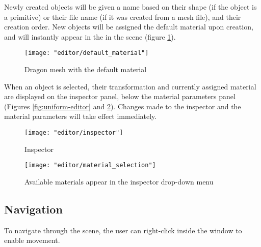 Newly created objects will be given a name based on their shape (if the object is a primitive) or their file name (if it was created from a mesh file), and their creation order. New objects will be assigned the default material upon creation, and will instantly appear in the in the scene (figure \ref{fig:default_material}).

\begin{figure}
    \caption{Dragon mesh with the default material}
    \begin{center}
        \texttt{[image: "editor/default\_material"]}
    \end{center}
    \label{fig:default_material}
\end{figure}

When an object is selected, their transformation and currently assigned material are displayed on the inspector panel, below the material parameters panel (Figures \ref{fig:uniform-editor} and \ref{fig:inspector}). Changes made to the inspector and the material parameters will take effect immediately.

\begin{figure}
    \caption{Inspector}
    \begin{center}
        \texttt{[image: "editor/inspector"]}
    \end{center}
    \label{fig:inspector}
\end{figure}

\begin{figure}
    \caption{Available materials appear in the inspector drop-down menu}
    \begin{center}
        \texttt{[image: "editor/material\_selection"]}
    \end{center}
    \label{fig:material_selection}
\end{figure}

\subsection{Navigation}
To navigate through the scene, the user can right-click inside the window to enable movement.

